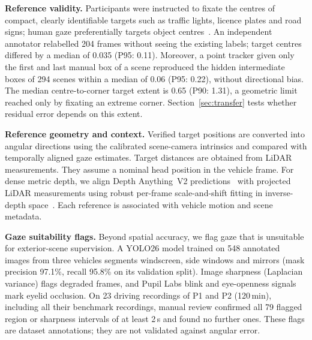 \textbf{Reference validity.}
Participants were instructed to fixate the centres of compact,
clearly identifiable targets such as traffic lights, licence
plates and road signs; human gaze preferentially targets object
centres~\cite{kowler1995accuracy,nuthmann2010object}.
An independent annotator relabelled 204 frames without seeing
the existing labels; target centres differed by a median of
0.035\dg{} (P95: 0.11\dg{}). Moreover, a point
tracker given only the first and last manual box of a scene
reproduced the hidden intermediate boxes of 294 scenes within
a median of 0.06\dg{} (P95: 0.22\dg{}), without directional bias.
The median centre-to-corner target extent is 0.65\dg{}
(P90: 1.31\dg{}), a geometric limit reached only by fixating
an extreme corner. Section~\ref{sec:transfer} tests whether
residual error depends on this extent.


\textbf{Reference geometry and context.}
Verified target positions are converted into angular directions
using the calibrated scene-camera intrinsics and compared with
temporally aligned gaze estimates. Target distances are obtained from LiDAR measurements.
They assume a nominal head position in the vehicle frame.
For dense metric depth, we align Depth Anything~V2
predictions~\cite{yang2024depthAnythingV2} with projected LiDAR measurements using robust per-frame
scale-and-shift fitting in inverse-depth space~\cite{marsal2025depth}. Each reference is associated with
vehicle motion and scene metadata.


\textbf{Gaze suitability flags.}
Beyond spatial accuracy, we flag gaze that is unsuitable for
exterior-scene supervision. A YOLO26 model trained on 548
annotated images from three vehicles segments windscreen, side
windows and mirrors (mask precision 97.1\%, recall 95.8\% on
its validation split). Image sharpness (Laplacian variance)
flags degraded frames, and Pupil Labs blink and eye-openness
signals mark eyelid occlusion. On 23 driving recordings of P1
and P2 (120\,min), including all their benchmark recordings,
manual review confirmed all 79 flagged region or
sharpness intervals of at least 2\,s and found no further ones.
These flags are dataset annotations; they are not validated
against angular error.

